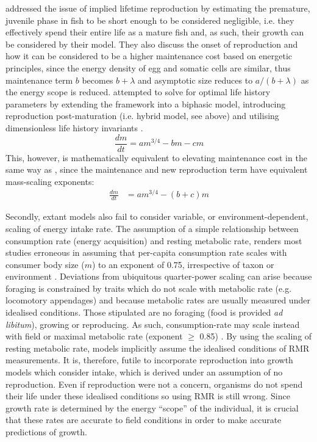 \documentclass[a4paper]{article} %
\begin{document}
        \cite{West2001} addressed the issue of implied lifetime reproduction by estimating the premature, juvenile phase in fish to be short enough to be considered negligible, i.e. they effectively spend their entire life as a mature fish and, as such, their growth can be considered by their model. They also discuss the onset of reproduction and how it can be considered to be a higher maintenance cost based on energetic principles, since the energy density of egg and somatic cells are similar, thus maintenance term $b$ becomes $b + \lambda$ and asymptotic size reduces to $a/(b+\lambda)$ as the energy scope is reduced. \cite{Charnov2001} attempted to solve for optimal life history parameters by extending the \cite{West2001} framework into a biphasic model, introducing reproduction post-maturation (i.e. hybrid model, see above) and utilising dimensionless life history invariants \autocite{Charnov1993}.
        \begin{equation}
            \frac{dm}{dt} = am^{3/4} - bm - cm \label{charnov_ogm}
        \end{equation}
        This, however, is mathematically equivalent to elevating maintenance cost in the same way as \cite{West2001}, since the maintenance and new reproduction term have equivalent mass-scaling exponents:
        \begin{align*}
            \frac{dm}{dt} &= am^{3/4} - (b+c)m
        \end{align*}

        Secondly, extant models also fail to consider variable, or environment-dependent, scaling of energy intake rate. The assumption of a simple relationship between consumption rate (energy acquisition) and resting metabolic rate, renders most studies erroneous in assuming that per-capita consumption rate scales with consumer body size ($m$) to an exponent of 0.75, irrespective of taxon or environment \autocite{Pawar2012}. Deviations from ubiquitous quarter-power scaling can arise because foraging is constrained by traits which do not scale with metabolic rate (e.g. locomotory appendages) and because metabolic rates are usually measured under idealised conditions. Those stipulated are no foraging (food is provided \textit{ad libitum}), growing or reproducing. As such, consumption-rate may scale instead with field or maximal metabolic rate (exponent $\geq$ 0.85) \autocite{peters1983,Weibel2004, Pawar2012}. By using the scaling of resting metabolic rate, models implicitly assume the idealised conditions of RMR measurements. It is, therefore, futile to incorporate reproduction into growth models which consider intake, which is derived under an assumption of no reproduction. Even if reproduction were not a concern, organisms do not spend their life under these idealised conditions so using RMR is still wrong. Since growth rate is determined by the energy ``scope'' of the individual, it is crucial that these rates are accurate to field conditions in order to make accurate predictions of growth.
\end{document}
